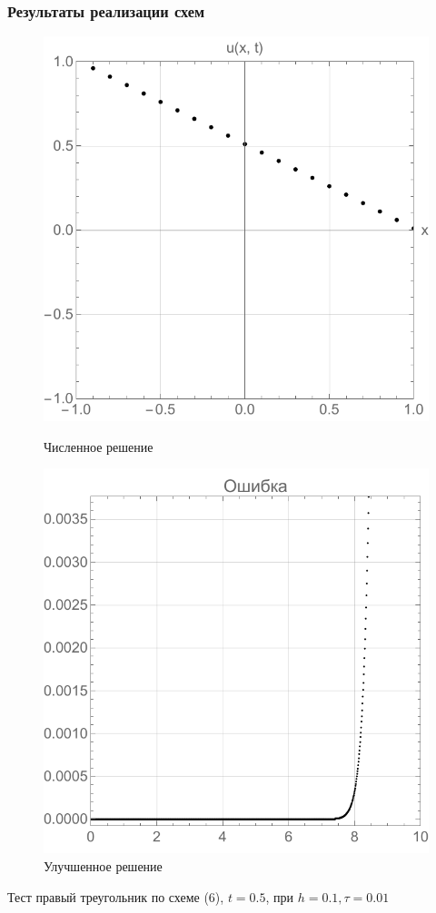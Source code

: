 \documentclass{beamer}
\begin{document}
\begin{frame}
	\frametitle{Результаты реализации схем}
	\begin{figure}
		\centering
		\begin{minipage}{0.45\textwidth}
			\centering
			\includegraphics[width=\textwidth]{res5_2}
			\caption{Численное решение}
			\label{fig:first}
		\end{minipage}\hfill
		\begin{minipage}{0.45\textwidth}
			\centering
			\includegraphics[width=\textwidth]{res5_3}
			\caption{Улучшенное решение}
			\label{fig:second}
		\end{minipage}
	\end{figure}
	\centering Тест правый треугольник по схеме  (6), $ t = 0.5$, при $h = 0.1, \tau = 0.01$
\end{frame}
\end{document}
